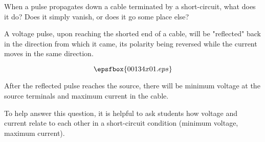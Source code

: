 

When a pulse propagates down a cable terminated by a short-circuit, what does it do?  Does it simply vanish, or does it go some place else?







A voltage pulse, upon reaching the shorted end of a cable, will be "reflected" back in the direction from which it came, its polarity being reversed while the current moves in the same direction.

$$\epsfbox{00134x01.eps}$$

After the reflected pulse reaches the source, there will be minimum voltage at the source terminals and maximum current in the cable.
 






To help answer this question, it is helpful to ask students how voltage and current relate to each other in a short-circuit condition (minimum voltage, maximum current).




